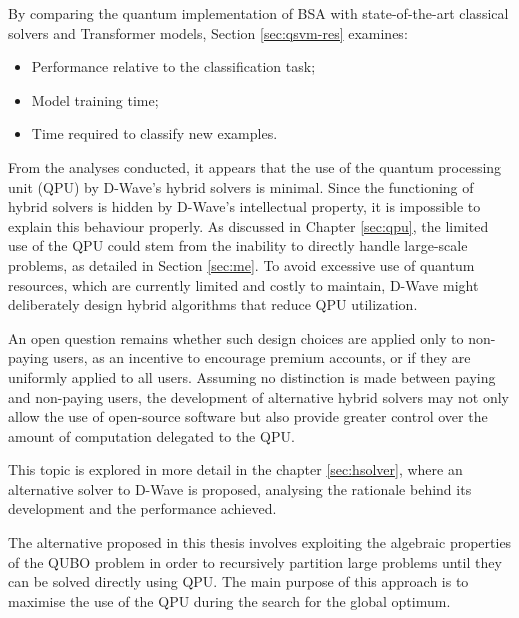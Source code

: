 By comparing the quantum implementation of BSA with state-of-the-art classical solvers and Transformer models, Section \ref{sec:qsvm-res} examines:
\begin{itemize}
    \item Performance relative to the classification task;
    \item Model training time;
    \item Time required to classify new examples.
\end{itemize}

From the analyses conducted, it appears that the use of the quantum processing unit (QPU) by D-Wave’s hybrid solvers is minimal.
Since the functioning of hybrid solvers is hidden by D-Wave’s intellectual property, it is impossible to explain this behaviour properly.
As discussed in Chapter \ref{sec:qpu}, the limited use of the QPU could stem from the inability to directly handle large-scale problems, as detailed in Section \ref{sec:me}.
To avoid excessive use of quantum resources, which are currently limited and costly to maintain, D-Wave might deliberately design hybrid algorithms that reduce QPU utilization.

An open question remains whether such design choices are applied only to non-paying users, as an incentive to encourage premium accounts, or if they are uniformly applied to all users.
Assuming no distinction is made between paying and non-paying users, the development of alternative hybrid solvers may not only allow the use of open-source software but also provide greater control over the amount of computation delegated to the QPU.

This topic is explored in more detail in the chapter \ref{sec:hsolver}, where an alternative solver to D-Wave is proposed, analysing the rationale behind its development and the performance achieved.

The alternative proposed in this thesis involves exploiting the algebraic properties of the QUBO problem in order to recursively partition large problems until they can be solved directly using QPU. The main purpose of this approach is to maximise the use of the QPU during the search for the global optimum.
